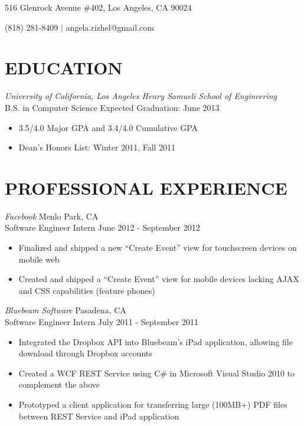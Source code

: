 \documentclass{res}
\begin{document}

\begin{resume}
\centerline{516 Glenrock Avenue \#402, Los Angeles, CA 90024}
\centerline{(818) 281-8409 $|$ angela.rizhel@gmail.com }

\section{EDUCATION}
\vspace{8pt}
{\sl{University of California}, Los Angeles \hfill Henry Samueli School of Engineering} \\
B.S. in Computer Science \hfill Expected Graduation: June 2013

\begin{itemize} \itemsep -2pt %
  \item 3.5/4.0 Major GPA and 3.4/4.0 Cumulative GPA
  \item Dean's Honors List: Winter 2011, Fall 2011
\end{itemize} \vspace{-6pt}

\section{PROFESSIONAL EXPERIENCE}
\vspace{6pt}
  {\sl Facebook} \hfill Menlo Park, CA \\
  Software Engineer Intern \hfill June 2012 - September 2012

   \begin{itemize} \itemsep -2pt %
     \item Finalized and shipped a new ``Create Event'' view for touchscreen devices on mobile web
     \item Created and shipped a ``Create Event'' view for mobile devices lacking AJAX and CSS capabilities (feature phones)
   \end{itemize} \vspace{-6pt}

 {\sl Bluebeam Software} \hfill Pasadena, CA \\
 Software Engineer Intern \hfill July 2011 - September 2011

   \begin{itemize} \itemsep -2pt
   \item Integrated the Dropbox API into Bluebeam's iPad application, allowing file download through Dropbox accounts
   \item Created a WCF REST Service using C\# in Microsoft Visual Studio 2010 to complement the above
   \item Prototyped a client application for transferring large (100MB+) PDF files between  REST Service and iPad application
   \end{itemize} \vspace{-12pt}


\end{resume}
\end{document}

